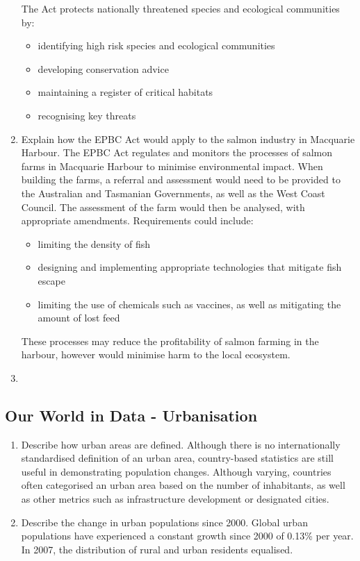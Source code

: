 \begin{enumerate}
				The Act protects nationally threatened species and ecological communities by:
				\begin{itemize}
					\item identifying high risk species and ecological communities
					\item developing conservation advice
					\item maintaining a register of critical habitats
					\item recognising key threats
				\end{itemize}
			\item Explain how the EPBC Act would apply to the salmon industry in Macquarie Harbour.
			\subitem The EPBC Act regulates and monitors the processes of salmon farms in Macquarie Harbour to minimise environmental impact. When building the farms, a referral and assessment would need to be provided to the Australian and Tasmanian Governments, as well as the West Coast Council. The assessment of the farm would then be analysed, with appropriate amendments. Requirements could include:
			\begin{itemize}
				\item limiting the density of fish
				\item designing and implementing appropriate technologies that mitigate fish escape
				\item limiting the use of chemicals such as vaccines, as well as mitigating the amount of lost feed
			\end{itemize}
			These processes may reduce the profitability of salmon farming in the harbour, however would minimise harm to the local ecosystem.
			\item 
		\end{enumerate}

	\subsection{Our World in Data - Urbanisation}
		\begin{enumerate}
			\item Describe how urban areas are defined.
				\subitem Although there is no internationally standardised definition of an urban area, country-based statistics are still useful in demonstrating population changes. Although varying, countries often categorised an urban area based on the number of inhabitants, as well as other metrics such as infrastructure development or designated cities.
			\item Describe the change in urban populations since 2000.
				\subitem Global urban populations have experienced a constant growth since 2000 of 0.13\% per year. In 2007, the distribution of rural and urban residents equalised.
		\end{enumerate}
